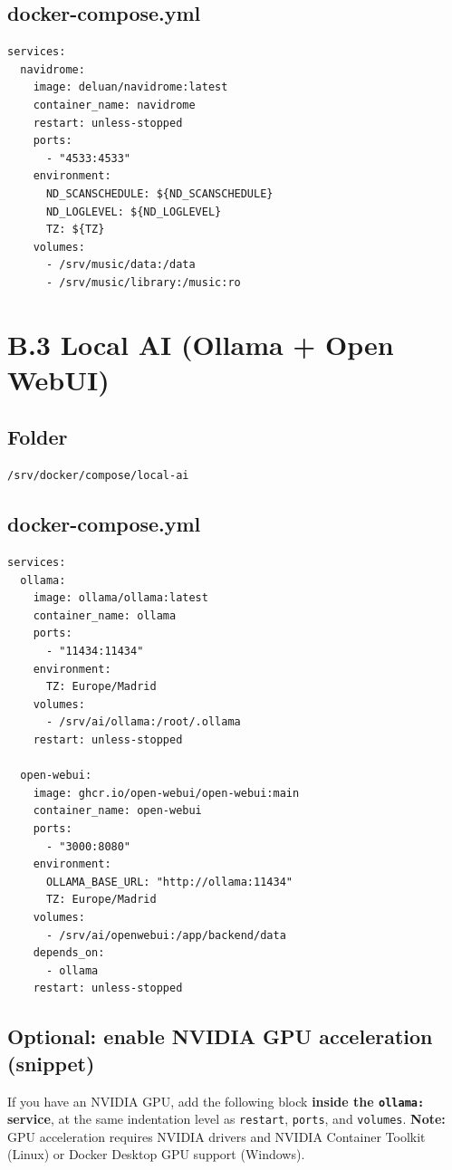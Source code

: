 \subsection*{docker-compose.yml}
\begin{lstlisting}
services:
  navidrome:
    image: deluan/navidrome:latest
    container_name: navidrome
    restart: unless-stopped
    ports:
      - "4533:4533"
    environment:
      ND_SCANSCHEDULE: ${ND_SCANSCHEDULE}
      ND_LOGLEVEL: ${ND_LOGLEVEL}
      TZ: ${TZ}
    volumes:
      - /srv/music/data:/data
      - /srv/music/library:/music:ro
\end{lstlisting}

\section{B.3 Local AI (Ollama + Open WebUI)}
\subsection*{Folder}
\begin{lstlisting}
/srv/docker/compose/local-ai
\end{lstlisting}

\subsection*{docker-compose.yml}
\begin{lstlisting}
services:
  ollama:
    image: ollama/ollama:latest
    container_name: ollama
    ports:
      - "11434:11434"
    environment:
      TZ: Europe/Madrid
    volumes:
      - /srv/ai/ollama:/root/.ollama
    restart: unless-stopped

  open-webui:
    image: ghcr.io/open-webui/open-webui:main
    container_name: open-webui
    ports:
      - "3000:8080"
    environment:
      OLLAMA_BASE_URL: "http://ollama:11434"
      TZ: Europe/Madrid
    volumes:
      - /srv/ai/openwebui:/app/backend/data
    depends_on:
      - ollama
    restart: unless-stopped
\end{lstlisting}

\subsection*{Optional: enable NVIDIA GPU acceleration (snippet)}
If you have an NVIDIA GPU, add the following block \textbf{inside the \texttt{ollama:} service},
at the same indentation level as \texttt{restart}, \texttt{ports}, and \texttt{volumes}.
\textbf{Note:} GPU acceleration requires NVIDIA drivers and NVIDIA Container Toolkit (Linux) or Docker Desktop GPU support (Windows).

